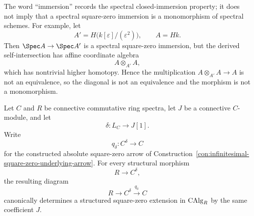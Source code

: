 \begin{remark}
\label{rem:infinitesimal-square-zero-not-monomorphism}
The word ``immersion'' records the spectral closed-immersion property; it does
not imply that a spectral square-zero immersion is a monomorphism of spectral
schemes.  For example, let
\[
    A'=H\bigl(k[\varepsilon]/(\varepsilon^2)\bigr),
    \qquad
    A=Hk.
\]
Then $\Spec A\to\Spec A'$ is a spectral square-zero immersion, but the
derived self-intersection has affine coordinate algebra
\[
    A\otimes_{A'}A,
\]
which has nontrivial higher homotopy.  Hence the multiplication
$A\otimes_{A'}A\to A$ is not an equivalence, so the diagonal is not an
equivalence and the morphism is not a monomorphism.
\end{remark}

\begin{lemma}
\label{lem:infinitesimal-relative-square-zero}
Let \(C\) and \(R\) be connective commutative ring spectra, let \(J\) be a
connective \(C\)-module, and let
\[
    \delta:L_C\longrightarrow J[1].
\]
Write
\[
    q_\delta:C^\delta\longrightarrow C
\]
for the constructed absolute square-zero arrow of
Construction~\ref{con:infinitesimal-square-zero-underlying-arrow}.  For every
structural morphism
\[
    R\longrightarrow C^\delta,
\]
the resulting diagram
\[
    R\longrightarrow C^\delta\xrightarrow{q_\delta}C
\]
canonically determines a structured square-zero extension in \(\operatorname{CAlg}_R\) by
the same coefficient \(J\).
\end{lemma}

